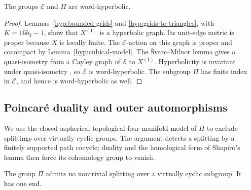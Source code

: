 \begin{proposition}
\label{hyp:word-hyperbolic}
The groups \(\mathcal E\) and \(\Pi\) are word-hyperbolic.
\end{proposition}

\begin{proof}
Lemmas~\ref{hyp:bounded-grids} and \ref{hyp:grids-to-triangles}, with
\(K=16b_T-1\), show that \(X^{(1)}\) is a hyperbolic graph.  Its
unit-edge metric is proper because \(X\) is locally finite.  The
\(\mathcal E\)-action on this graph is proper and cocompact by
Lemma~\ref{hyp:cubical-model}.  The \v{S}varc--Milnor lemma
\cite[Proposition~I.8.19]{BridsonHaefliger1999} gives a quasi-isometry
from a Cayley graph of \(\mathcal E\) to \(X^{(1)}\).
Hyperbolicity is invariant under quasi-isometry
\cite[Theorem~III.H.1.9]{BridsonHaefliger1999}, so \(\mathcal E\) is
word-hyperbolic.  The subgroup \(\Pi\) has finite index in
\(\mathcal E\), and hence is
word-hyperbolic as well.
\end{proof}

\subsection{Poincar\'e duality and outer automorphisms}

We use the closed aspherical topological four-manifold model of
\(\Pi\) to exclude splittings over virtually cyclic groups.  The
argument detects a splitting by a finitely supported path cocycle;
duality and the homological form of Shapiro's lemma then force its
cohomology group to vanish.

\begin{lemma}
\label{hyp:no-vc-splitting}
The group \(\Pi\) admits no nontrivial splitting over a virtually
cyclic subgroup.  It has one end.
\end{lemma}

